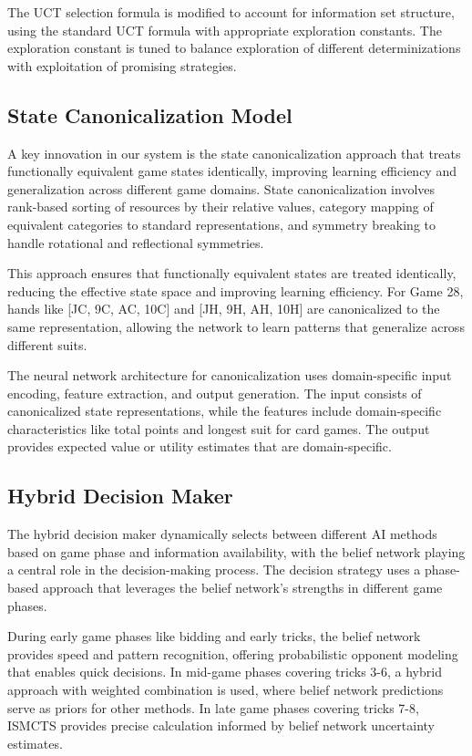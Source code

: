 \documentclass[conference]{IEEEtran}
\begin{document}
The UCT selection formula is modified to account for information set structure, using the standard UCT formula with appropriate exploration constants. The exploration constant is tuned to balance exploration of different determinizations with exploitation of promising strategies.

\subsection{State Canonicalization Model}

A key innovation in our system is the state canonicalization approach that treats functionally equivalent game states identically, improving learning efficiency and generalization across different game domains. State canonicalization involves rank-based sorting of resources by their relative values, category mapping of equivalent categories to standard representations, and symmetry breaking to handle rotational and reflectional symmetries.

This approach ensures that functionally equivalent states are treated identically, reducing the effective state space and improving learning efficiency. For Game 28, hands like [JC, 9C, AC, 10C] and [JH, 9H, AH, 10H] are canonicalized to the same representation, allowing the network to learn patterns that generalize across different suits.

The neural network architecture for canonicalization uses domain-specific input encoding, feature extraction, and output generation. The input consists of canonicalized state representations, while the features include domain-specific characteristics like total points and longest suit for card games. The output provides expected value or utility estimates that are domain-specific.

\subsection{Hybrid Decision Maker}

The hybrid decision maker dynamically selects between different AI methods based on game phase and information availability, with the belief network playing a central role in the decision-making process. The decision strategy uses a phase-based approach that leverages the belief network's strengths in different game phases.

During early game phases like bidding and early tricks, the belief network provides speed and pattern recognition, offering probabilistic opponent modeling that enables quick decisions. In mid-game phases covering tricks 3-6, a hybrid approach with weighted combination is used, where belief network predictions serve as priors for other methods. In late game phases covering tricks 7-8, ISMCTS provides precise calculation informed by belief network uncertainty estimates.
\end{document}
